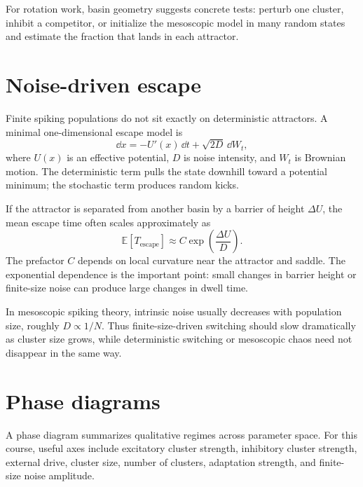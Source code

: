 For rotation work, basin geometry suggests concrete tests: perturb one cluster, inhibit a competitor, or initialize the mesoscopic model in many random states and estimate the fraction that lands in each attractor.

\section{Noise-driven escape}
\label{sec:noise-driven-escape-clustered}

Finite spiking populations do not sit exactly on deterministic attractors. A minimal one-dimensional escape model is
%
\begin{equation}
  \dd x = -U'(x)\,\dd t + \sqrt{2D}\,\dd W_t,
  \label{eq:potential-escape-sde}
\end{equation}
%
where $U(x)$ is an effective potential, $D$ is noise intensity, and $W_t$ is Brownian motion. The deterministic term pulls the state downhill toward a potential minimum; the stochastic term produces random kicks.

If the attractor is separated from another basin by a barrier of height $\Delta U$, the mean escape time often scales approximately as
%
\begin{equation}
  \mathbb{E}[T_{\mathrm{escape}}]
  \approx C \exp\!\left(\frac{\Delta U}{D}\right).
  \label{eq:kramers-scaling}
\end{equation}
%
The prefactor $C$ depends on local curvature near the attractor and saddle. The exponential dependence is the important point: small changes in barrier height or finite-size noise can produce large changes in dwell time.

In mesoscopic spiking theory, intrinsic noise usually decreases with population size, roughly $D\propto 1/N$. Thus finite-size-driven switching should slow dramatically as cluster size grows, while deterministic switching or mesoscopic chaos need not disappear in the same way.

\section{Phase diagrams}
\label{sec:phase-diagrams-clustered}

A phase diagram summarizes qualitative regimes across parameter space. For this course, useful axes include excitatory cluster strength, inhibitory cluster strength, external drive, cluster size, number of clusters, adaptation strength, and finite-size noise amplitude.

